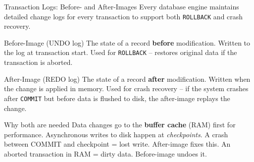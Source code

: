 \begin{frame}{Transaction Logs: Before- and After-Images}
  Every database engine maintains detailed change logs for every transaction
  to support both \texttt{ROLLBACK} and crash recovery.

  \begin{block}{Before-Image (UNDO log)}
    The state of a record \textbf{before} modification. Written to the log at
    transaction start. Used for \texttt{ROLLBACK} -- restores original data if
    the transaction is aborted.
  \end{block}

  \begin{block}{After-Image (REDO log)}
    The state of a record \textbf{after} modification. Written when the change
    is applied in memory. Used for crash recovery -- if the system crashes after
    \texttt{COMMIT} but before data is flushed to disk, the after-image replays
    the change.
  \end{block}

  \begin{alertblock}{Why both are needed}
    Data changes go to the \textbf{buffer cache} (RAM) first for performance.
    Asynchronous writes to disk happen at \emph{checkpoints}.
    A crash between COMMIT and checkpoint = lost write. After-image fixes this.
    An aborted transaction in RAM = dirty data. Before-image undoes it.
  \end{alertblock}
\end{frame}

